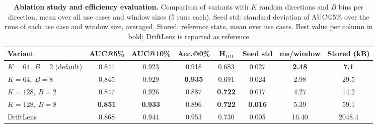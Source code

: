 \begin{table}[htbp!]
\centering
\caption{\textbf{Ablation study and efficiency evaluation.} Comparison of \method variants with $K$ random directions and $B$ bins per direction, mean over all use cases and window sizes (5 runs each). Seed std: standard deviation of AUC@5\% over the runs of each use case and window size, averaged. Stored: reference state, mean over use cases. Best \method{} value per column in bold; DriftLens is reported as reference}
\label{tab:variants_new}
\setlength{\tabcolsep}{8pt}
\begin{tabular}{lccccccc}
\toprule
\textbf{Variant} & AUC@5\% & AUC@10\% & Acc.@0\% & H$_{\text{DD}}$ & Seed std & ms/window & Stored (kB) \\
\midrule
$K{=}64,\ B{=}2$ (default) & 0.841 & 0.923 & 0.918 & 0.683 & 0.027 & \textbf{2.48} & \textbf{7.1} \\
$K{=}64,\ B{=}8$ & 0.845 & 0.929 & \textbf{0.935} & 0.691 & 0.024 & 2.98 & 29.5 \\
$K{=}128,\ B{=}2$ & 0.847 & 0.926 & 0.887 & \textbf{0.722} & 0.017 & 4.27 & 14.2 \\
$K{=}128,\ B{=}8$ & \textbf{0.851} & \textbf{0.933} & 0.896 & \textbf{0.722} & \textbf{0.016} & 5.39 & 59.1 \\
\midrule
DriftLens & 0.868 & 0.944 & 0.953 & 0.730 & 0.005 & 16.40 & 2048.4 \\
\bottomrule
\end{tabular}
\end{table}
